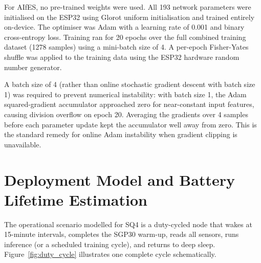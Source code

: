 For AIfES, no pre-trained weights were used. All 193 network parameters were initialised on the ESP32 using Glorot uniform initialisation and trained entirely on-device. The optimiser was Adam with a learning rate of 0.001 and binary cross-entropy loss. Training ran for 20 epochs over the full combined training dataset (1278 samples) using a mini-batch size of 4. A per-epoch Fisher-Yates shuffle was applied to the training data using the ESP32 hardware random number generator.

A batch size of 4 (rather than online stochastic gradient descent with batch size 1) was required to prevent numerical instability: with batch size 1, the Adam squared-gradient accumulator approached zero for near-constant input features, causing division overflow on epoch 20. Averaging the gradients over 4 samples before each parameter update kept the accumulator well away from zero. This is the standard remedy for online Adam instability when gradient clipping is unavailable.

\section{Deployment Model and Battery Lifetime Estimation}\label{sec:deployment_model}

The operational scenario modelled for SQ4 is a duty-cycled node that wakes at 15-minute intervals, completes the SGP30 warm-up, reads all sensors, runs inference (or a scheduled training cycle), and returns to deep sleep. Figure~\ref{fig:duty_cycle} illustrates one complete cycle schematically.


